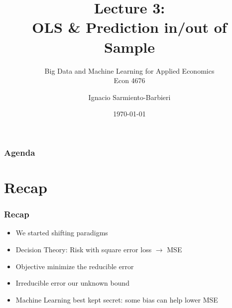 \documentclass[
  shownotes,
  xcolor={svgnames},
  hyperref={colorlinks,citecolor=DarkBlue,linkcolor=DarkRed,urlcolor=DarkBlue}
  ]{beamer}
\begin{document}
\title[Lecture 3]{Lecture 3: \\ OLS \& Prediction in/out of Sample}
\subtitle{Big Data and Machine Learning for Applied Economics \\ Econ 4676}
\date{\today}

\author[Sarmiento-Barbieri]{Ignacio Sarmiento-Barbieri}


\begin{frame}[noframenumbering]
\maketitle
\end{frame}





\begin{frame}
\frametitle{Agenda}

\tableofcontents


\end{frame}



\section{Recap}

\begin{frame}
\frametitle{Recap}

\begin{itemize} 
    \item We started shifting paradigms
    \bigskip
    \item Decision Theory: Risk with square error loss $\rightarrow$ MSE
    \bigskip
    \item Objective minimize the reducible error
    \bigskip
    \item Irreducible error our unknown bound
    \bigskip
    \item Machine Learning best kept secret:  some bias can help lower MSE
\end{itemize}
\end{frame}

\end{document}
